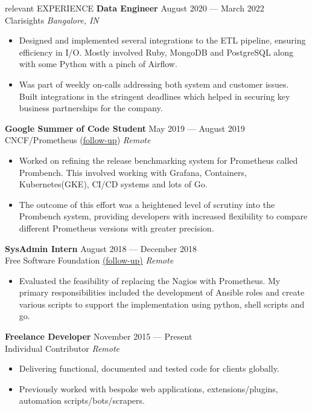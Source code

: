 \documentclass{resume} %
\begin{document}
\begin{rSection}{relevant EXPERIENCE}
  \textbf{Data Engineer} \hfill August 2020 — March 2022\\
  Clarisights \hfill \textit{Bangalore, IN}
  \begin{itemize}
    \itemsep -3pt {}
    \item Designed and implemented several integrations to the ETL pipeline, ensuring efficiency in I/O. Mostly involved Ruby, MongoDB and PostgreSQL along with some Python with a pinch of Airflow.
    \item Was part of weekly on-calls addressing both system and customer issues. Built integrations in the stringent deadlines which helped in securing key business partnerships for the company.
  \end{itemize}

  \textbf{Google Summer of Code Student} \hfill May 2019 — August 2019\\
  CNCF/Prometheus (\href{https://blog.geekodour.org/posts/gsoc19/}{follow-up}) \hfill \textit{Remote}
  \begin{itemize}
    \itemsep -3pt {}
    \item Worked on refining the release benchmarking system for Prometheus called Prombench. This involved working with Grafana, Containers, Kubernetes(GKE), CI/CD systems and lots of Go.
    \item The outcome of this effort was a heightened level of scrutiny into the Prombench system, providing developers with increased flexibility to compare different Prometheus versions with greater precision.
  \end{itemize}

  \textbf{SysAdmin Intern} \hfill August 2018 — December 2018\\
  Free Software Foundation \href{https://www.fsf.org/blogs/sysadmin/what-i-learned-during-my-internship-with-the-fsf-tech-team}{(follow-up)} \hfill \textit{Remote}
  \begin{itemize}
    \itemsep -3pt {}
    \item Evaluated the feasibility of replacing the Nagios with Prometheus. My primary responsibilities included the development of Ansible roles and create various scripts to support the implementation using python, shell scripts and go.
  \end{itemize}

  \textbf{Freelance Developer} \hfill November 2015 — Present\\
  Individual Contributor \hfill \textit{Remote}
  \begin{itemize}
    \itemsep -3pt {}
    \item Delivering functional, documented and tested code for clients globally.
    \item Previously worked with bespoke web applications, extensions/plugins, automation scripts/bots/scrapers.
  \end{itemize}

\end{rSection}
\end{document}
